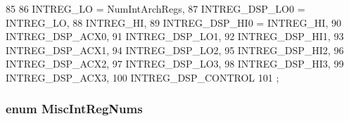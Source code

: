 \begin{DoxyCode}
85                     {
86    INTREG_LO = NumIntArchRegs,
87    INTREG_DSP_LO0 = INTREG_LO,
88    INTREG_HI,
89    INTREG_DSP_HI0 = INTREG_HI,
90    INTREG_DSP_ACX0,
91    INTREG_DSP_LO1,
92    INTREG_DSP_HI1,
93    INTREG_DSP_ACX1,
94    INTREG_DSP_LO2,
95    INTREG_DSP_HI2,
96    INTREG_DSP_ACX2,
97    INTREG_DSP_LO3,
98    INTREG_DSP_HI3,
99    INTREG_DSP_ACX3,
100    INTREG_DSP_CONTROL
101 };
\end{DoxyCode}
\hypertarget{namespaceMipsISA_a9969c99e14b7b491ae9e3751404cc6a1}{
\subsubsection[{MiscIntRegNums}]{\setlength{\rightskip}{0pt plus 5cm}enum {\bf MiscIntRegNums}}}
\label{namespaceMipsISA_a9969c99e14b7b491ae9e3751404cc6a1}
